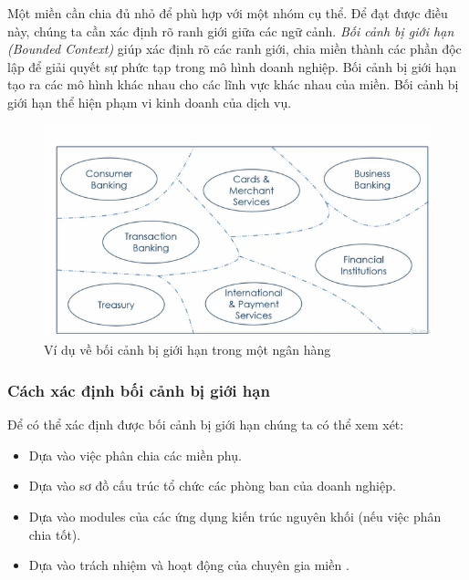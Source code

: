 Một miền cần chia đủ nhỏ để phù hợp với một nhóm cụ thể. Để đạt được điều này, chúng ta cần xác định rõ ranh giới giữa các ngữ cảnh. \emph{Bối cảnh bị giới hạn (Bounded Context)} giúp xác định rõ các ranh giới, chia miền thành các phần độc lập để giải quyết sự phức tạp trong mô hình doanh nghiệp. Bối cảnh bị giới hạn tạo ra các mô hình khác nhau cho các lĩnh vực khác nhau của miền. Bối cảnh bị giới hạn thể hiện phạm vi kinh doanh của dịch vụ.

\begin{figure}[H]

    \centering

    \includegraphics[scale = 1]{pictures/boi_canh_gioi_han/main.png}

    \caption{Ví dụ về bối cảnh bị giới hạn trong một ngân hàng}

\end{figure}

\subsubsection{Cách xác định bối cảnh bị giới hạn}

Để có thể xác định được bối cảnh bị giới hạn chúng ta có thể xem xét:

\begin{itemize}

    \item Dựa vào việc phân chia các miền phụ.

    \item Dựa vào sơ đồ cấu trúc tổ chức các phòng ban của doanh nghiệp.

    \item Dựa vào modules của các ứng dụng kiến trúc nguyên khối (nếu việc phân chia tốt).

    \item Dựa vào trách nhiệm và hoạt động của chuyên gia miền .

\end{itemize}

